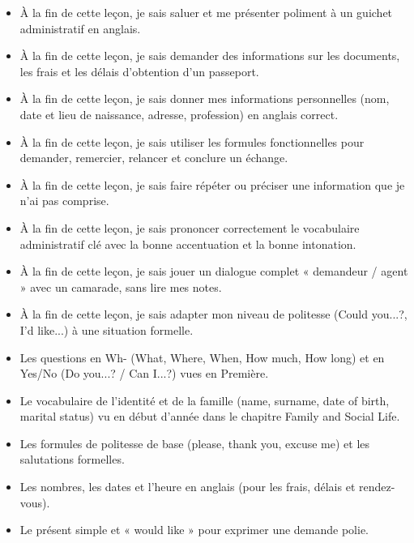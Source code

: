 \documentclass[11pt]{article}
\begin{document}
\begin{objectifs}
\begin{itemize}
\item À la fin de cette leçon, je sais saluer et me présenter poliment à un guichet administratif en anglais.
\item À la fin de cette leçon, je sais demander des informations sur les documents, les frais et les délais d'obtention d'un passeport.
\item À la fin de cette leçon, je sais donner mes informations personnelles (nom, date et lieu de naissance, adresse, profession) en anglais correct.
\item À la fin de cette leçon, je sais utiliser les formules fonctionnelles pour demander, remercier, relancer et conclure un échange.
\item À la fin de cette leçon, je sais faire répéter ou préciser une information que je n'ai pas comprise.
\item À la fin de cette leçon, je sais prononcer correctement le vocabulaire administratif clé avec la bonne accentuation et la bonne intonation.
\item À la fin de cette leçon, je sais jouer un dialogue complet « demandeur / agent » avec un camarade, sans lire mes notes.
\item À la fin de cette leçon, je sais adapter mon niveau de politesse (Could you...?, I'd like...) à une situation formelle.
\end{itemize}
\end{objectifs}

\begin{prerequis}
\begin{itemize}
\item Les questions en Wh- (What, Where, When, How much, How long) et en Yes/No (Do you...? / Can I...?) vues en Première.
\item Le vocabulaire de l'identité et de la famille (name, surname, date of birth, marital status) vu en début d'année dans le chapitre Family and Social Life.
\item Les formules de politesse de base (please, thank you, excuse me) et les salutations formelles.
\item Les nombres, les dates et l'heure en anglais (pour les frais, délais et rendez-vous).
\item Le présent simple et « would like » pour exprimer une demande polie.
\end{itemize}
\end{prerequis}
\end{document}
